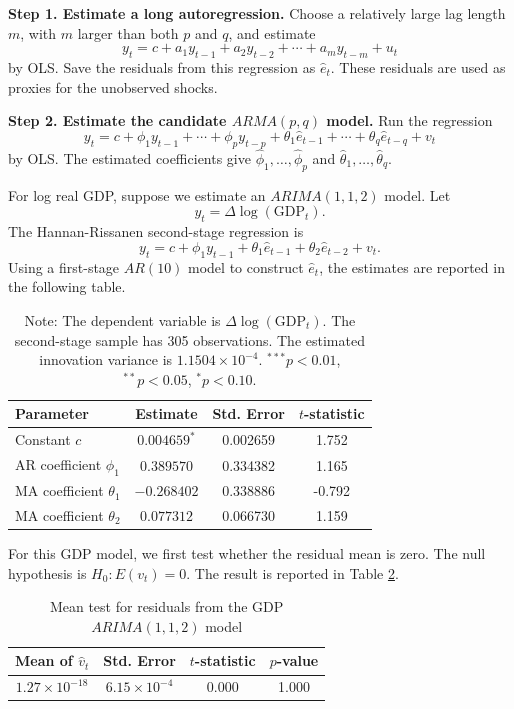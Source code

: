 \documentclass[12pt]{article}
\begin{document}
\textbf{Step 1. Estimate a long autoregression.} Choose a relatively large lag length $m$, with $m$ larger than both $p$ and $q$, and estimate
\[
    y_t = c + a_1 y_{t-1} + a_2 y_{t-2} + \cdots + a_m y_{t-m} + u_t
\]
by OLS. Save the residuals from this regression as $\hat e_t$. These residuals are used as proxies for the unobserved shocks.

\textbf{Step 2. Estimate the candidate $ARMA(p,q)$ model.} Run the regression
\[
    y_t
    = c
    + \phi_1 y_{t-1} + \cdots + \phi_p y_{t-p}
    + \theta_1 \hat e_{t-1} + \cdots + \theta_q \hat e_{t-q}
    + v_t
\]
by OLS. The estimated coefficients give $\hat\phi_1,\ldots,\hat\phi_p$ and $\hat\theta_1,\ldots,\hat\theta_q$.

For log real GDP, suppose we estimate an $ARIMA(1,1,2)$ model. Let
\[
    y_t=\Delta\log(\text{GDP}_t).
\]
The Hannan-Rissanen second-stage regression is
\[
    y_t = c + \phi_1 y_{t-1} + \theta_1 \hat e_{t-1} + \theta_2 \hat e_{t-2} + v_t.
\]
Using a first-stage $AR(10)$ model to construct $\hat e_t$, the estimates are reported in the following table.

\begin{table}[H]
    \centering
    \caption{Hannan-Rissanen estimates for $ARIMA(1,1,2)$ of log real GDP}
    \label{tab:rgdp-hr-arima112}
    \begin{tabular}{lccc}
        \toprule
        Parameter & Estimate & Std. Error & $t$-statistic \\
        \midrule
        Constant $c$ & $0.004659^{*}$ & 0.002659 & 1.752 \\
        AR coefficient $\phi_1$ & $0.389570$ & 0.334382 & 1.165 \\
        MA coefficient $\theta_1$ & $-0.268402$ & 0.338886 & -0.792 \\
        MA coefficient $\theta_2$ & $0.077312$ & 0.066730 & 1.159 \\
        \bottomrule
    \end{tabular}
    \caption*{\footnotesize{Note: The dependent variable is $\Delta\log(\text{GDP}_t)$. The second-stage sample has 305 observations. The estimated innovation variance is $1.1504\times 10^{-4}$. $^{***}p<0.01$, $^{**}p<0.05$, $^{*}p<0.10$.}}
\end{table}

For this GDP model, we first test whether the residual mean is zero. The null hypothesis is $H_0:E(v_t)=0$. The result is reported in Table \ref{tab:rgdp-resid-mean-test}.

\begin{table}[H]
    \centering
    \caption{Mean test for residuals from the GDP $ARIMA(1,1,2)$ model}
    \label{tab:rgdp-resid-mean-test}
    \begin{tabular}{cccc}
        \toprule
        Mean of $\hat v_t$ & Std. Error & $t$-statistic & $p$-value \\
        \midrule
        $1.27\times 10^{-18}$ & $6.15\times 10^{-4}$ & 0.000 & 1.000 \\
        \bottomrule
    \end{tabular}
\end{table}
\end{document}
